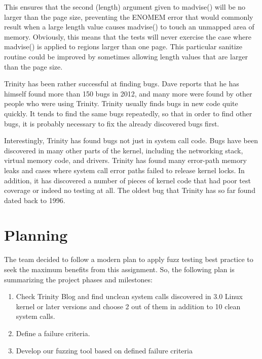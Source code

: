 \documentclass[twoside]{article}
\begin{document}
\begin{multicols}{2}
This ensures that the second (length) argument given to madvise() will be no larger than the page size, preventing the ENOMEM error that would commonly result when a large length value causes madvise() to touch an unmapped area of memory. Obviously, this means that the tests will never exercise the case where madvise() is applied to regions larger than one page. This particular sanitize routine could be improved by sometimes allowing length values that are larger than the page size.

Trinity has been rather successful at finding bugs. Dave reports that he has himself found more than 150 bugs in 2012, and many more were found by other people who were using Trinity. Trinity usually finds bugs in new code quite quickly. It tends to find the same bugs repeatedly, so that in order to find other bugs, it is probably necessary to fix the already discovered bugs first.

Interestingly, Trinity has found bugs not just in system call code. Bugs have been discovered in many other parts of the kernel, including the networking stack, virtual memory code, and drivers. Trinity has found many error-path memory leaks and cases where system call error paths failed to release kernel locks. In addition, it has discovered a number of pieces of kernel code that had poor test coverage or indeed no testing at all. The oldest bug that Trinity has so far found dated back to 1996.



\section{Planning}

The team decided to follow a modern plan to apply fuzz testing best practice to seek the maximum benefits from this assignment. So, the following plan is summarizing the project phases and milestones:

\begin{enumerate}

\item Check Trinity Blog and find unclean system calls discovered in 3.0 Linux kernel or later versions  and choose 2 out of them in addition to 10 clean system calls.

\item Define a failure criteria.

\item Develop our fuzzing tool based on defined failure criteria


\end{enumerate}
\end{multicols}
\end{document}
